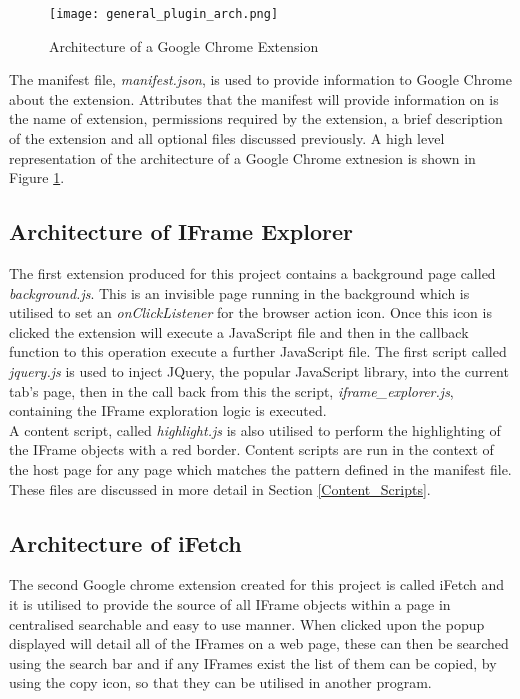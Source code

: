 \documentclass[12pt]{article}
\begin{document}
\begin{figure}[H]
    \centering
    \texttt{[image: general\_plugin\_arch.png]}
    \caption{Architecture of a Google Chrome Extension}
    \label{fig:general_plugin_arch}
\end{figure}

The manifest file, \textit{manifest.json}, is used to provide information to Google Chrome about the extension. Attributes that the manifest will provide information on is the name of extension, permissions required by the extension, a brief description of the extension and all optional files discussed previously. A high level representation of the architecture of a Google Chrome extnesion is shown in Figure \ref{fig:general_plugin_arch}. 

\subsection{Architecture of IFrame Explorer}
The first extension produced for this project contains a background page called \textit{background.js}. This is an invisible page running in the background which is utilised to set an \textit{onClickListener} for the browser action icon. Once this icon is clicked the extension will execute a JavaScript file and then in the callback function to this operation execute a further JavaScript file. The first script called \textit{jquery.js} is used to inject JQuery, the popular JavaScript library, into the current tab's page, then in the call back from this the script, \textit{iframe\_explorer.js}, containing the IFrame exploration logic is executed. \\

A content script, called \textit{highlight.js} is also utilised to perform the highlighting of the IFrame objects with a red border. Content scripts are run in the context of the host page for any page which matches the pattern defined in the manifest file. These files are discussed in more detail in Section \ref{Content_Scripts}. 

\subsection{Architecture of iFetch}
The second Google chrome extension created for this project is called iFetch and it is utilised to provide the source of all IFrame objects within a page in centralised searchable and easy to use manner. When clicked upon the popup displayed will detail all of the IFrames on a web page, these can then be searched using the search bar and if any IFrames exist the list of them can be copied, by using the copy icon, so that they can be utilised in another program. \\
\end{document}
